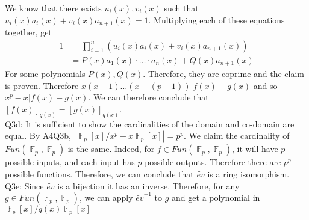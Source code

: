 \documentclass[letterpaper]{article}
\DeclareMathOperator{\F}{\mathbb{F}}
\begin{document}
We know that there exists $u_i(x),v_i(x)$ such that $u_i(x)a_i(x) + v_i(x)a_{n+1}(x)=1$. Multiplying each of these equations together, get
\begin{align*}
1 & =\prod_{i=1}^n (u_i(x) a_i(x) + v_i(x) a_{n+1}(x))
\\ & = P(x)a_1(x)\cdot \dots \cdot a_{n}(x) + Q(x)a_{n+1}(x)
\end{align*} For some polynomials $P(x),Q(x)$. Therefore, they are coprime and the claim is proven. Therefore $x(x-1)\dots (x-(p-1))|f(x)-g(x)$ and so $x^p-x|f(x)-g(x)$. We can therefore conclude that $[f(x)]_{q(x)} = [g(x)]_{q(x)}$. 
\newline \\ Q3d: It is sufficient to show the cardinalities of the domain and co-domain are equal. By A4Q3b, \newline $|\F_p[x] / x^p-x \F_p[x]|=p^p$. We claim the cardinality of $Fun(\F_p,\F_p)$ is the same. Indeed, for $f\in Fun(\F_p,\F_p)$, it will have $p$ possible inputs, and each input has $p$ possible outputs. Therefore there are $p^p$ possible functions. Therefore, we can conclude that $\widetilde{ev}$ is a ring isomorphism. 
\newline \\ Q3e: Since $\widetilde{ev}$ is a bijection it has an inverse. Therefore, for any $g\in Fun(\F_p,\F_p)$, we can apply $\widetilde{ev}^{-1}$ to $g$ and get a polynomial in $\F_p[x] / q(x) \F_p[x]$
\end{document}
